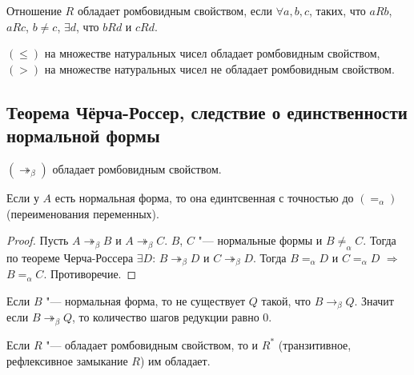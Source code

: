 \begin{definition}
	Отношение $R$ обладает ромбовидным свойством, если $\forall a,b,c$, таких, что $aRb$, $aRc$, $b\neq{}c$, $\exists{}d$, что $bRd$ и $cRd$.
\end{definition}

\begin{example}
	$(\leq)$ на множестве натуральных чисел обладает ромбовидным свойством,
	$(>)$ на множестве натуральных чисел не обладает ромбовидным свойством.
\end{example}

\subsection{Теорема Чёрча-Россер, следствие о единственности нормальной формы}

\begin{theorem}
	$(\twoheadrightarrow_{\beta})$ обладает ромбовидным свойством.
\end{theorem}


\begin{cons}
	Если у $A$ есть нормальная форма, то она единтсвенная с точностью до $(=_{\alpha})$ (переименования переменных).
\end{cons}

\begin{proof}
	Пусть $A\twoheadrightarrow_{\beta}B$ и $A\twoheadrightarrow_{\beta}C$. $B$, $C$ "--- нормальные формы и $B\neq_{\alpha}C$. 
	Тогда по теореме Черча-Россера $\exists{}D$: $B\twoheadrightarrow_{\beta}D$ и $C\twoheadrightarrow_{\beta}D$. Тогда $B=_{\alpha}D$ и $C=_{\alpha} D$ $\Rightarrow$ $B=_{\alpha}C$. Противоречие.
\end{proof}

\begin{lemma}
	Если $B$ "--- нормальная форма, то не существует $Q$ такой, что $B\to_{\beta}Q$. Значит если $B\twoheadrightarrow_{\beta}Q$, то количество шагов редукции равно 0.
\end{lemma}

\begin{lemma}
	 \label{refl}
	Если $R$ "--- обладает ромбовидным свойством, то и $R^{*}$ (транзитивное, рефлексивное замыкание $R$) им обладает.
\end{lemma}

